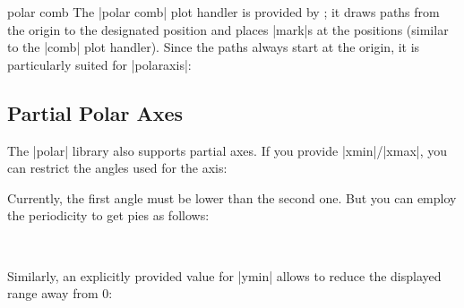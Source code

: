 {\begin{plottype}{polar comb}
    The |polar comb| plot handler is provided by \Tikz{}; it draws paths from
    the origin to the designated position and places |mark|s at the positions
    (similar to the |comb| plot handler). Since the paths always start at the
    origin, it is particularly suited for |polaraxis|:
\begin{codeexample}[]
\end{codeexample}
\end{plottype}


\subsection{Partial Polar Axes}

The |polar| library also supports partial axes. If you provide |xmin|/|xmax|,
you can restrict the angles used for the axis:
%
\begin{codeexample}[]
\end{codeexample}

Currently, the first angle must be lower than the second one. But you can
employ the periodicity to get pies as follows:
%
%
\begin{codeexample}[]
~%
\end{codeexample}
%
\noindent Similarly, an explicitly provided value for |ymin| allows to reduce
the displayed range away from $0$:
%
\begin{codeexample}[]
\end{codeexample}

}
